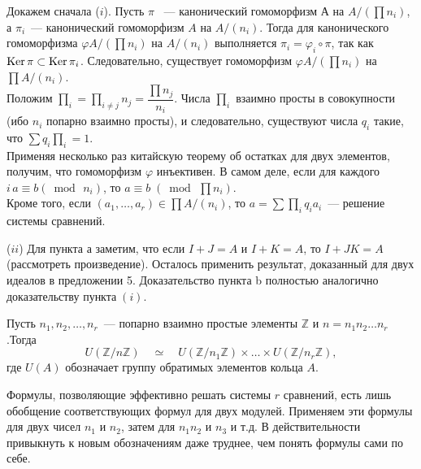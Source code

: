     \begin{myproof}
    Докажем сначала ($i$). Пусть $\pi$ ~— канонический гомоморфизм $А$ на $A/(\prod n_i)$, а $\pi_i$~— канонический гомоморфизм $A$ на $A/(n_i)$. Тогда для канонического гомоморфизма $\varphi A/(\prod n_i)$ на $A/(n_i)$ выполняется $\pi_i = \varphi_i \circ \pi$, так как $\operatorname{Ker} \pi \subset \operatorname{Ker} \pi_i$. Следовательно, существует гомоморфизм $\varphi A/(\prod n_i)$ \linebreak на $\prod A/(n_i)$.\\
    Положим $\prod_i = \prod\nolimits_{i \ne j}n_j = \dfrac {\prod n_j} {n_i}$. Числа $\prod_i$ взаимно просты в совокупности (ибо $n_i$ попарно взаимно просты), и следовательно, существуют числа $q_i$ такие, что $\sum q_i \prod\nolimits_i = 1$.\\
    Применяя несколько раз китайскую теорему об остатках для двух элементов, получим, что гомоморфизм $\varphi$ инъективен. В самом деле, если для каждого $i\,a \equiv b (\bmod\,n_i)$, то $a \equiv b\;(\bmod\,\prod n_i)$.\\
    Кроме того, если $(a_1, \ldots, a_r) \in \prod A/ (n_i)$, то $a = \sum\prod_i q_i a_i$~— решение системы сравнений.

    \noindent ($ii$) Для пункта а заметим, что если $I + J = A$ и $I + K = A$, то $I + JK = A$ (рассмотреть произведение). Осталось применить результат, доказанный для двух идеалов в предложении 5. Доказательство пункта b полностью аналогично доказательству пункта$\;(i)$.
    \end{myproof}

    \begin{sled}
    \hspace*{0.5cm}
    Пусть $n_1, n_2, \ldots, n_r$~— попарно взаимно простые элементы \linebreak $\mathbb{Z}$ и $n = n_1n_2\ldots n_r$.\;Тогда
    $$U(\mathbb{Z}/n\mathbb{Z})\quad \simeq \quad U(\mathbb{Z}/n_1\mathbb{Z}) \times \ldots \times U(\mathbb{Z}/n_r\mathbb{Z}),$$
    где $U(A)$ обозначает группу обратимых элементов кольца $A$.
    \end{sled}

    Формулы, позволяющие эффективно решать системы $r$ сравнений, есть лишь обобщение соответствующих формул для двух модулей. Применяем эти формулы для двух чисел $n_1$ и $n_2$, затем для $n_1n_2$ и $n_3$ и т.д. В действительности привыкнуть к новым обозначениям даже труднее, чем понять формулы сами по себе.

